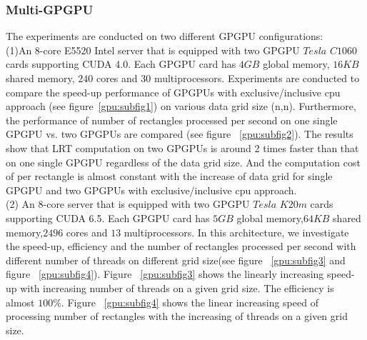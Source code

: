 \documentclass[AMA,LATO1COL]{WileyNJD-v2}
\begin{document}
\subsubsection{Multi-GPGPU}
\noindent The experiments are conducted on two different GPGPU configurations:
\\ (1)An 8-core E5520 Intel server that is equipped with two GPGPU $Tesla$ $C1060$ cards supporting CUDA 4.0. Each GPGPU card has $4GB$ global memory, $16KB$ shared memory, $240$
cores and $30$ multiprocessors. Experiments are conducted to compare the speed-up performance of GPGPUs with exclusive/inclusive cpu approach (see figure~\ref{gpu:subfig1}) on various data grid size (n,n). Furthermore, the performance of number of rectangles processed per second on one single GPGPU vs. two GPGPUs are compared (see figure ~\ref{gpu:subfig2}). The results show that LRT computation on two GPGPUs is around 2 times faster than that on one single GPGPU regardless of the data grid size. And the computation cost of per rectangle is almost constant with the increase of data grid for single GPGPU and two GPGPUs with exclusive/inclusive cpu approach.
\\ (2) An 8-core server that is equipped with two GPGPU $Tesla$ $K20m$ cards supporting CUDA 6.5. Each GPGPU card has $5GB$ global memory,$64KB$ shared memory,$2496$ cores and $13$ multiprocessors. In this architecture, we investigate the speed-up, efficiency and the number of rectangles processed per second with different number of threads on different grid size(see figure ~\ref{gpu:subfig3} and figure ~\ref{gpu:subfig4}). Figure ~\ref{gpu:subfig3} shows the linearly increasing speed-up with increasing number of threads on a given grid size. The efficiency is almost $100\%$. Figure ~\ref{gpu:subfig4} shows the linear increasing speed of processing number of rectangles with the increasing of threads on a given grid size.   \\
\end{document}
